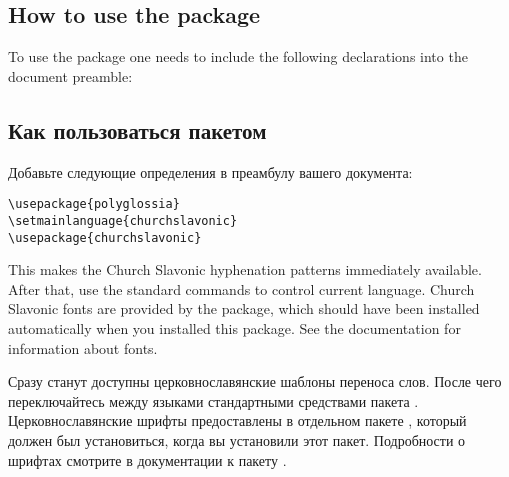 \begin{EN}
\section{How to use the package}
To use the  package one needs to include the following
declarations into the document preamble:
\end{EN}

\begin{RU}
\section{Как пользоваться пакетом}
Добавьте следующие определения в преамбулу вашего документа:
\end{RU}

\begin{verbatim}
\usepackage{polyglossia}
\setmainlanguage{churchslavonic}
\usepackage{churchslavonic}
\end{verbatim}

\begin{EN}
This makes the Church Slavonic hyphenation patterns immediately available.
After that, use the standard  commands to control current language.
Church Slavonic fonts are provided by the  package,
which should have been installed automatically when you installed this package.
See the  documentation for information about fonts.
\end{EN}

\begin{RU}
Сразу станут доступны церковнославянские шаблоны переноса слов.
После чего переключайтесь между языками стандартными средствами пакета .
Церковнославянские шрифты предоставлены в отдельном пакете ,
который должен был установиться, когда вы установили этот пакет.
Подробности о шрифтах смотрите в документации к пакету .
\end{RU}

